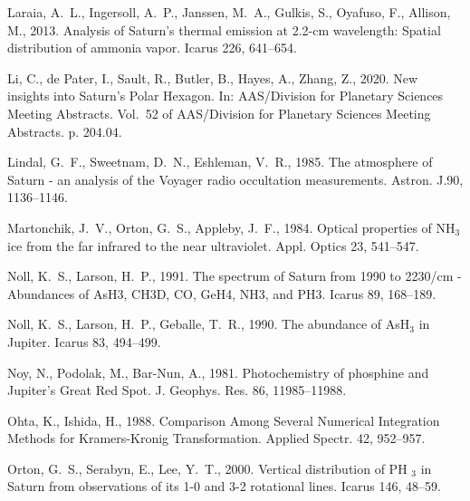 \documentclass[article,11pt]{emulateapj}
\def\jgr{J. Geophys. Res. }
\def\aj{Astron. J.}
\begin{document}
\begin{thebibliography}{85}
{Laraia}, A.~L., {Ingersoll}, A.~P., {Janssen}, M.~A., {Gulkis}, S., {Oyafuso},
  F., {Allison}, M., 2013. {Analysis of Saturn's thermal emission at 2.2-cm
  wavelength: Spatial distribution of ammonia vapor}. Icarus 226, 641--654.

{Li}, C., {de Pater}, I., {Sault}, R., {Butler}, B., {Hayes}, A., {Zhang}, Z.,
  2020. {New insights into Saturn's Polar Hexagon}. In: AAS/Division for
  Planetary Sciences Meeting Abstracts. Vol.~52 of AAS/Division for Planetary
  Sciences Meeting Abstracts. p. 204.04.

{Lindal}, G.~F., {Sweetnam}, D.~N., {Eshleman}, V.~R., 1985. {The atmosphere of
  Saturn - an analysis of the Voyager radio occultation measurements}. \aj 90,
  1136--1146.

{Martonchik}, J.~V., {Orton}, G.~S., {Appleby}, J.~F., 1984. {Optical
  properties of NH$_3$ ice from the far infrared to the near ultraviolet}.
  Appl. Optics 23, 541--547.

{Noll}, K.~S., {Larson}, H.~P., 1991. {The spectrum of Saturn from 1990 to
  2230/cm - Abundances of AsH3, CH3D, CO, GeH4, NH3, and PH3}. Icarus 89,
  168--189.

{Noll}, K.~S., {Larson}, H.~P., {Geballe}, T.~R., 1990. {The abundance of
  AsH$_3$ in Jupiter}. Icarus 83, 494--499.

{Noy}, N., {Podolak}, M., {Bar-Nun}, A., 1981. {Photochemistry of phosphine and
  Jupiter's Great Red Spot}. \jgr 86, 11985--11988.

{Ohta}, K., {Ishida}, H., 1988. {Comparison Among Several Numerical Integration
  Methods for Kramers-Kronig Transformation}. Applied Spectr. 42, 952--957.

{Orton}, G.~S., {Serabyn}, E., {Lee}, Y.~T., 2000. {Vertical distribution of PH
  $_{3}$ in Saturn from observations of its 1-0 and 3-2 rotational lines}.
  Icarus 146, 48--59.


\end{thebibliography}
\end{document}

